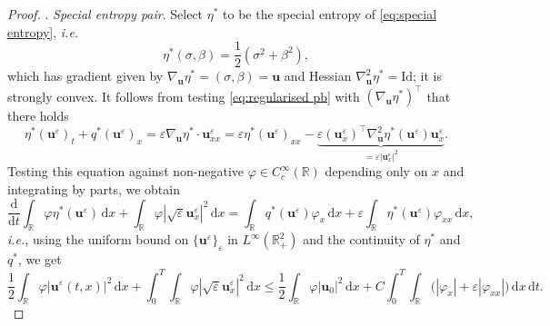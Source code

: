 \documentclass[11pt,a4paper,reqno]{amsart}
\numberwithin{equation}{section}
\theoremstyle{definition}
\theoremstyle{remark}
\newcommand{\bu}{\mathbf{u}}
\renewcommand{\d}{\, \mathrm{d}}
\newcommand{\der}{\mathrm{d}}
\renewcommand{\leq}{\leqslant}
\begin{document}
{\begin{proof}
\smallskip 
{}. \textit{Special entropy pair}. Select $\eta^*$ to be the special entropy of \eqref{eq:special entropy}, \textit{i.e.}
\begin{equation*}
    \eta^*(\sigma,\beta) = \frac{1}{2}(\sigma^2 + \beta^2), 
\end{equation*}
which has gradient given by $\nabla_\bu \eta^* = (\sigma,\beta)=\bu$ and Hessian $\nabla^2_\bu \eta^* = \mathrm{Id}$; it is strongly convex. It follows from testing \eqref{eq:regularised pb} with $(\nabla_\bu \eta^*)^\intercal$ that there holds 
\begin{equation}\label{eq:exp form ent eqn with viscosity}
    \eta^*(\bu^\varepsilon)_t + q^*(\bu^\varepsilon)_x = \varepsilon\nabla_\bu \eta^* \cdot \bu^\varepsilon_{xx} = \varepsilon\eta^*(\bu^\varepsilon)_{xx} - \underbrace{\varepsilon(\bu^\varepsilon_x)^\intercal \nabla^2_\bu \eta^*(\bu^\varepsilon) \bu_x^\varepsilon}_{=\varepsilon |\bu^\varepsilon_x|^2}. 
\end{equation}
Testing this equation against non-negative $\varphi \in C^\infty_c(\mathbb{R})$ depending only on $x$ and integrating by parts, we obtain 
\begin{equation*}
    \frac{\der}{\der t}\int_\mathbb{R}\varphi \eta^*(\bu^\varepsilon) \d x + \int_\mathbb{R} \varphi |\sqrt{\varepsilon}\bu^\varepsilon_x|^2 \d x = \int_\mathbb{R}  q^*(\bu^\varepsilon) \varphi_x \d x + \varepsilon \int_\mathbb{R} \eta^*(\bu^\varepsilon) \varphi_{xx} \d x, 
\end{equation*}
\textit{i.e.}, using the uniform bound on $\{\bu^\varepsilon\}_\varepsilon$ in $L^\infty(\mathbb{R}^2_+)$ and the continuity of $\eta^*$ and $q^*$, we get 
\begin{equation}\label{eq:convex entropy estimate not quite}
    \frac{1}{2}\int_\mathbb{R} \varphi |\bu^\varepsilon(t,x)|^2 \d x + \int_0^T \! \! \int_\mathbb{R} \varphi |\sqrt{\varepsilon}\bu^\varepsilon_x|^2 \d x \leq \frac{1}{2}\int_\mathbb{R} \varphi |\bu_0|^2 \d x + C\int_0^T \! \! \int_\mathbb{R} \! \! \big( |\varphi_x| + \varepsilon |\varphi_{xx}| \big) \d x \d t. 
\end{equation}



\end{proof}}
\end{document}
